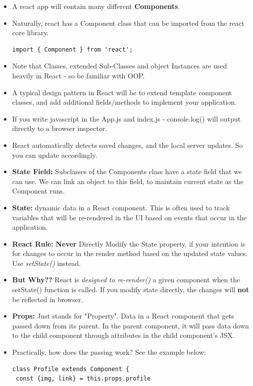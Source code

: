 \documentclass[8pt,a4paper]{extarticle}
\begin{document}
\begin{itemize}
\item A react app will contain many different \textbf{Components}.
\item Naturally, react has a Component class that can be imported from the react core library.

\begin{verbatim}
import { Component } from 'react';
\end{verbatim}

\item Note that Classes, extended Sub-Classes and object Instances are used heavily in React - so be familiar with OOP.
\item A typical design pattern in React will be to extend template component classes, and add additional fields/methods to implement your application.
\item If you write javascript in the App.js and index.js - console.log() will output directly to a browser inspector.
\item React automatically detects saved changes, and the local server updates. So you can update accordingly.
\item \textbf{State Field:} Subclasses of the Components class have a state field that we can use. We can link an object to this field, to maintain current state as the Component runs.
\item \textbf{State:} dynamic data in a React component. This is often used to track variables that will be re-rendered in the UI based on events that occur in the application.
\item \textbf{React Rule:} \textbf{Never} Directly Modify the State property, if your intention is for changes to occur in the render method based on the updated state values. Use \textit{setState()} instead.
\item \textbf{But Why??} React is \textit{designed to re-render()} a given component when the setState() function is called. If you modify state directly, the changes will \textbf{not} be reflected in browser.
\item \textbf{Props:} Just stands for "Property". Data in a React component that gets passed down from its parent. In the parent component, it will pass data down to the child component through attributes in the child component’s JSX.
\item Practically, how does the passing work? See the example below:

\begin{verbatim}
class Profile extends Component {
 const {img, link} = this.props.profile


\end{verbatim}
\end{itemize}
\end{document}

